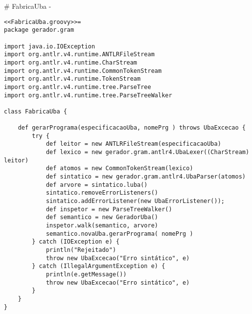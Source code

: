 # FabricaUba {-}

\begin{lstlisting}[style=java]
<<FabricaUba.groovy>>=
package gerador.gram

import java.io.IOException
import org.antlr.v4.runtime.ANTLRFileStream
import org.antlr.v4.runtime.CharStream
import org.antlr.v4.runtime.CommonTokenStream
import org.antlr.v4.runtime.TokenStream
import org.antlr.v4.runtime.tree.ParseTree
import org.antlr.v4.runtime.tree.ParseTreeWalker

class FabricaUba {

    def gerarPrograma(especificacaoUba, nomePrg ) throws UbaExcecao {
        try {
            def leitor = new ANTLRFileStream(especificacaoUba)
            def lexico = new gerador.gram.antlr4.UbaLexer((CharStream) leitor)
            def atomos = new CommonTokenStream(lexico)
            def sintatico = new gerador.gram.antlr4.UbaParser(atomos)
            def arvore = sintatico.luba()
            sintatico.removeErrorListeners()
            sintatico.addErrorListener(new UbaErrorListener());
            def inspetor = new ParseTreeWalker()
            def semantico = new GeradorUba()
            inspetor.walk(semantico, arvore)
            semantico.novaUba.gerarPrograma( nomePrg )
        } catch (IOException e) {
            println("Rejeitado")
            throw new UbaExcecao("Erro sintático", e)
        } catch (IllegalArgumentException e) {
            println(e.getMessage())
            throw new UbaExcecao("Erro sintático", e)
        }
    }
}

\end{lstlisting}
